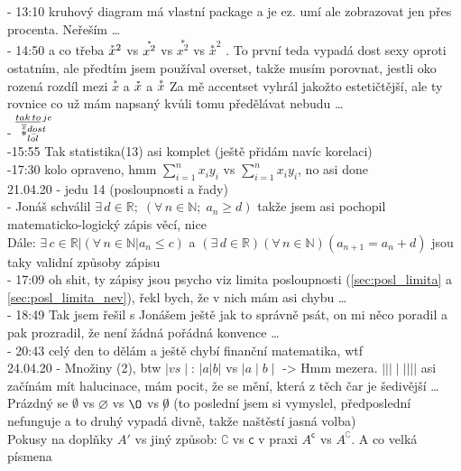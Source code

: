 \documentclass[12pt]{article}
\begin{document}
 - 13:10 kruhový diagram má vlastní package a je ez. umí ale zobrazovat jen přes procenta. Neřeším \dots\\
 - 14:50 a co třeba $\accentset{*}{x}^2$ vs $\accentset{*}{x^2}$ vs $\overset{*}{x^2}$ vs $\overset{*}{x}^2$ . To první teda vypadá dost sexy oproti ostatním, ale předtím jsem používal overset, takže musím porovnat, jestli oko rozená rozdíl mezi $\overset{*}{x}$ a $\accentset{*}{x}$ a $\accentset{\scriptstyle *}{x}$ Za mě accentset vyhrál jakožto estetičtější, ale ty rovnice co už mám napsaný kvůli tomu předělávat nebudu \dots \\
 - $\overset{\underline{tak\, to}\, je}{ \accentset{\overline{x}}{*}_{\bar{lol}}^{dost}}$ \\%
 -15:55 Tak statistika(13) asi komplet (ještě přidám navíc korelaci)\\ 
 -17:30 kolo opraveno,  hmm $ \sum^n_{i=1}x_i y_i$ vs $ \sum\limits^n_{i=1}x_i y_i$, no asi done\\
21.04.20 - jedu 14 (posloupnosti a řady)\\
 - Jonáš schválil $\exists \, d \in \mathbb{R}; \; \left( \forall \, n \in \mathbb{N}; \; a_n \geq d \right)$ takže jsem asi pochopil matematicko-logický zápis věcí, nice\\
 Dále:  $\exists \, c \in \mathbb{R} | \left( \forall \, n \in \mathbb{N} | a_n \leq c \right) $ a $\left( \exists \, d \in \mathbb{R} \right) \left( \forall \, n \in \mathbb{N} \right) \left( a_{n+1} = a_n + d \right)$ jsou taky validní způsoby zápisu\\
 - 17:09 oh shit, ty zápisy jsou psycho viz limita posloupnosti (\ref{sec:posl_limita} a \ref{sec:posl_limita_nev}), řekl bych, že v nich mám asi chybu \dots \\
 - 18:49 Tak jsem řešil s Jonášem ještě jak to správně psát, on mi něco poradil a pak prozradil, že není žádná pořádná konvence \dots \\
  - 20:43 celý den to dělám a ještě chybí finanční matematika, wtf\\
24.04.20 - Množiny (2),  btw $| vs \mid$: $| a |b|$ vs $\mid a\mid b\mid$ -> Hmm mezera. $\mid | \mid \mid \mid |||$ asi začínám mít halucinace, mám pocit, že se mění, která z těch čar je šedivější \dots \\
Prázdný se $\emptyset$ vs $\varnothing$ vs $\O$ vs $\not 0$ (to poslední jsem si vymyslel, předposlední nefunguje a to druhý vypadá divně, takže naštěstí jasná volba)\\
Pokusy na doplňky $A'$ vs  jiný způsob:  $\complement$ vs $\mathsf{c}$ v praxi $A^\mathsf{c}$ vs $A^\complement$. A co velká písmena %
\end{document}
